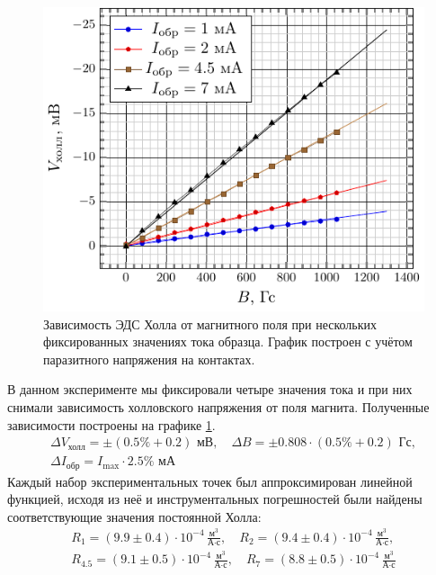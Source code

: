 \documentclass[a4paper,14pt]{extarticle}
\def\Rdim{\,\frac{\text{м}^3}{\text{А} \cdot \text{с}}}
\begin{document}
\begin{figure}[H]
	\centering
	\includegraphics[scale=1.2]{plot/field-hall_voltage-without_excess.pdf}
	\caption{Зависимость ЭДС Холла от магнитного поля при нескольких фиксированных значениях тока образца. График построен с учётом паразитного напряжения на контактах.}
	\label{fig:5.5}
\end{figure}

В данном эксперименте мы фиксировали четыре значения тока и при них снимали зависимость холловского напряжения от поля магнита. Полученные зависимости построены на графике \ref{fig:5.5}. 
\begin{gather}
	\Delta V_\text{холл} = \pm (0.5\%+0.2) \text{ мВ}, \quad
	\Delta B = \pm0.808\cdot(0.5\%+0.2)\text{ Гс},\\
	\Delta I_\text{обр} = I_{\max}\cdot 2.5\% \text{ мА}
\end{gather}
Каждый набор экспериментальных точек был аппроксимирован линейной функцией, исходя из неё и инструментальных погрешностей были найдены соответствующие значения постоянной Холла:
\begin{gather}
	R_1= (9.9\pm0.4)\cdot10^{-4} \Rdim, 	\quad
R_2= (9.4\pm0.4)\cdot10^{-4} \Rdim,\\
R_{4.5}= (9.1\pm0.5)\cdot10^{-4} \Rdim, 	\quad
R_7= (8.8\pm0.5)\cdot10^{-4} \Rdim
\end{gather}
\end{document}
